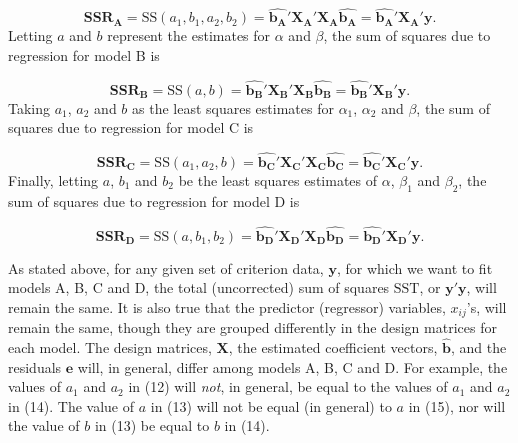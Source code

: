 \documentclass[11pt, oneside]{article}   	%
\begin{document}
\begin{equation}
\mathbf{SSR_{A}} = \mbox{SS} (a_{1}, b_{1},  a_{2}, b_{2}) =  \mathbf{\hat{b_{A}}} ' 
\mathbf{X_{A}} ' \mathbf{X_{A}} \mathbf{\hat{b_{A}}} = \mathbf{\hat{b_{A}}} '  \mathbf{X_{A}} ' \mathbf{y} . 
\end{equation} 
Letting $  a $ and $  b $ represent the estimates for $ \alpha  $ and $ \beta  $,  the sum of squares due to regression for model B is 

\begin{equation}
\mathbf{SSR_{B}} = \mbox{SS} (a, b) =  \mathbf{\hat{b_{B}}} ' 
\mathbf{X_{B}} ' \mathbf{X_{B}} \mathbf{\hat{b_{B}}} = \mathbf{\hat{b_{B}}} '  \mathbf{X_{B}} ' \mathbf{y} . 
\end{equation}
Taking $ a_{1}  $, $ a_{2}  $ and $ b  $ as the least squares estimates for $ \alpha_{1}  $,  $  \alpha_{2} $ and $  \beta $, the sum of squares due to regression for model C is 

\begin{equation}
\mathbf{SSR_{C}} = \mbox{SS} ( a_{1},  a_{2}, b) =  \mathbf{\hat{b_{C}}} ' 
\mathbf{X_{C}} ' \mathbf{X_{C}} \mathbf{\hat{b_{C}}} = \mathbf{\hat{b_{C}}} '  \mathbf{X_{C}} ' \mathbf{y} . 
\end{equation} 
Finally, letting $ a  $,  $  b_{1}  $ and  $  b_{2}  $ be the least squares estimates of $  \alpha  $, $  \beta_{1} $ and $  \beta_{2}  $, the sum of squares due to regression for model D is 

\begin{equation}
\mathbf{SSR_{D}} = \mbox{SS} (a, b_{1}, b_{2}) =  \mathbf{\hat{b_{D}}} ' 
\mathbf{X_{D}} ' \mathbf{X_{D}} \mathbf{\hat{b_{D}}} = \mathbf{\hat{b_{D}}} '  \mathbf{X_{D}} ' \mathbf{y} . 
\end{equation} 

\bigskip
As stated above, for any given set of criterion data, $\mathbf{y}$, for which we want to fit models A, B, C and D, the total (uncorrected) sum of squares $ \mbox{SST}$, or $  \mathbf{y} ' \mathbf{y} $, will remain the same.  It is also true that the predictor (regressor) variables, $ x_{ij} $'s, will remain the same, though they are grouped differently in the design matrices for each model.   The design matrices, $\mathbf{X} $, the estimated coefficient vectors, $\mathbf{\hat{b}} $, and the residuals $\mathbf{e} $ will, in general, differ among models A, B, C and D.  For example, the values of $ a_{1}  $ and $ a_{2}  $ in (12) will \emph{not}, in general, be equal to the values of $ a_{1}  $ and $ a_{2}  $ in (14).  The value of $ a $ in (13) will not be equal (in general) to $ a $ in (15), nor will the value of $ b  $ in (13) be equal to $ b $ in (14).  
\end{document}
